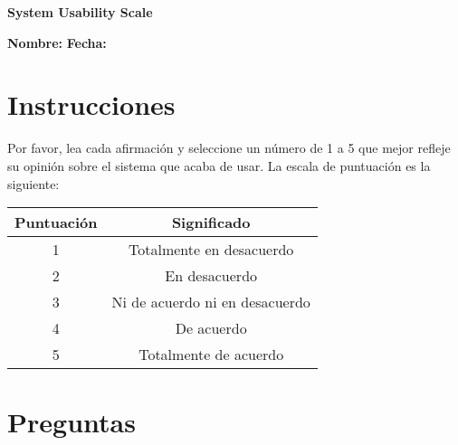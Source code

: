 \documentclass[letterpaper, 12pt]{article}
\date{}
\begin{document}
\begin{center}
    {\Large \textbf{System Usability Scale}\par}
\end{center}
\medskip

\noindent
\textbf{Nombre:} \underline{\hspace{6cm}} \hfill \textbf{Fecha:} \underline{\hspace{2cm}} \\[0.5cm]


\section*{Instrucciones}
\noindent Por favor, lea cada afirmación y seleccione un número de 1 a 5 que mejor refleje su opinión sobre el sistema que acaba de usar. La escala de puntuación es la siguiente:

\begin{center}
\begin{tabular}{|c|c|}
\hline
\textbf{Puntuación} & \textbf{Significado} \\
\hline
1 & Totalmente en desacuerdo \\
2 & En desacuerdo \\
3 & Ni de acuerdo ni en desacuerdo \\
4 & De acuerdo \\
5 & Totalmente de acuerdo \\
\hline
\end{tabular}
\end{center}

\section*{Preguntas}
\end{document}
